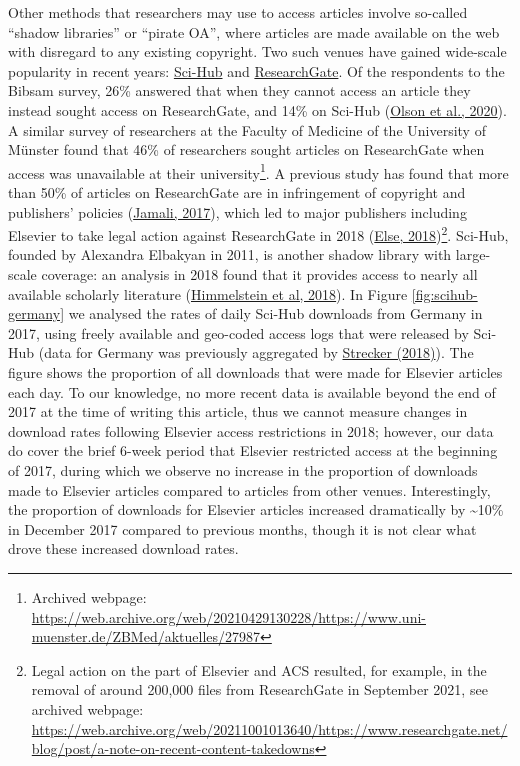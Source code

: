 \documentclass[
]{article}
\begin{document}
Other methods that researchers may use to access articles involve so-called ``shadow libraries'' or ``pirate OA'', where articles are made available on the web with disregard to any existing copyright. Two such venues have gained wide-scale popularity in recent years: \href{https://sci-hub.se/}{Sci-Hub} and \href{https://www.researchgate.net/}{ResearchGate}. Of the respondents to the Bibsam survey, 26\% answered that when they cannot access an article they instead sought access on ResearchGate, and 14\% on Sci-Hub (\href{http://doi.org/10.1629/uksg.507}{Olson et al., 2020}). A similar survey of researchers at the Faculty of Medicine of the University of Münster found that 46\% of researchers sought articles on ResearchGate when access was unavailable at their university\footnote{Archived webpage: \url{https://web.archive.org/web/20210429130228/https://www.uni-muenster.de/ZBMed/aktuelles/27987}}. A previous study has found that more than 50\% of articles on ResearchGate are in infringement of copyright and publishers' policies (\href{https://doi.org/10.1007/s11192-017-2291-4}{Jamali, 2017}), which led to major publishers including Elsevier to take legal action against ResearchGate in 2018 (\href{https://doi.org/10.1038/d41586-018-06945-6}{Else, 2018})\footnote{Legal action on the part of Elsevier and ACS resulted, for example, in the removal of around 200,000 files from ResearchGate in September 2021, see archived webpage: \url{https://web.archive.org/web/20211001013640/https://www.researchgate.net/blog/post/a-note-on-recent-content-takedowns}}. Sci-Hub, founded by Alexandra Elbakyan in 2011, is another shadow library with large-scale coverage: an analysis in 2018 found that it provides access to nearly all available scholarly literature (\href{https://doi.org/10.7554/eLife.32822}{Himmelstein et al, 2018}). In Figure \ref{fig:scihub-germany} we analysed the rates of daily Sci-Hub downloads from Germany in 2017, using freely available and geo-coded access logs that were released by Sci-Hub (data for Germany was previously aggregated by \href{http://doi.org/10.5281/zenodo.1286284}{Strecker (2018)}). The figure shows the proportion of all downloads that were made for Elsevier articles each day. To our knowledge, no more recent data is available beyond the end of 2017 at the time of writing this article, thus we cannot measure changes in download rates following Elsevier access restrictions in 2018; however, our data do cover the brief 6-week period that Elsevier restricted access at the beginning of 2017, during which we observe no increase in the proportion of downloads made to Elsevier articles compared to articles from other venues. Interestingly, the proportion of downloads for Elsevier articles increased dramatically by \textasciitilde10\% in December 2017 compared to previous months, though it is not clear what drove these increased download rates.
\end{document}

